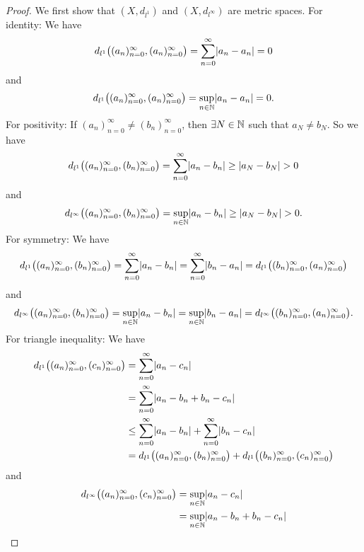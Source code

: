 \begin{proof}
  We first show that \((X, d_{l^1})\) and \((X, d_{l^\infty})\) are metric spaces.
  For identity:
  We have
  \[
    d_{l^1}\big((a_n)_{n = 0}^\infty, (a_n)_{n = 0}^\infty\big) = \sum_{n = 0}^\infty \abs{a_n - a_n} = 0
  \]
  and
  \[
    d_{l^1}\big((a_n)_{n = 0}^\infty, (a_n)_{n = 0}^\infty\big) = \sup_{n \in \N} \abs{a_n - a_n} = 0.
  \]
  For positivity:
  If \((a_n)_{n = 0}^\infty \neq (b_n)_{n = 0}^\infty\), then \(\exists N \in \mathbb{N}\) such that \(a_N \neq b_N\).
  So we have
  \[
    d_{l^1}\big((a_n)_{n = 0}^\infty, (b_n)_{n = 0}^\infty\big) = \sum_{n = 0}^\infty \abs{a_n - b_n} \geq \abs{a_N - b_N} > 0
  \]
  and
  \[
    d_{l^\infty}\big((a_n)_{n = 0}^\infty, (b_n)_{n = 0}^\infty\big) = \sup_{n \in \N} \abs{a_n - b_n} \geq \abs{a_N - b_N} > 0.
  \]
  For symmetry:
  We have
  \[
    d_{l^1}\big((a_n)_{n = 0}^\infty, (b_n)_{n = 0}^\infty\big) = \sum_{n = 0}^\infty \abs{a_n - b_n} = \sum_{n = 0}^\infty \abs{b_n - a_n} = d_{l^1}\big((b_n)_{n = 0}^\infty, (a_n)_{n = 0}^\infty\big)
  \]
  and
  \[
    d_{l^\infty}\big((a_n)_{n = 0}^\infty, (b_n)_{n = 0}^\infty\big) = \sup_{n \in \N} \abs{a_n - b_n} = \sup_{n \in \N} \abs{b_n - a_n} = d_{l^\infty}\big((b_n)_{n = 0}^\infty, (a_n)_{n = 0}^\infty\big).
  \]
  For triangle inequality:
  We have
  \begin{align*}
    d_{l^1}\big((a_n)_{n = 0}^\infty, (c_n)_{n = 0}^\infty\big) & = \sum_{n = 0}^\infty \abs{a_n - c_n}                                                                                       \\
                                                                & = \sum_{n = 0}^\infty \abs{a_n - b_n + b_n - c_n}                                                                           \\
                                                                & \leq \sum_{n = 0}^\infty \abs{a_n - b_n} + \sum_{n = 0}^\infty \abs{b_n - c_n}                                              \\
                                                                & = d_{l^1}\big((a_n)_{n = 0}^\infty, (b_n)_{n = 0}^\infty\big) + d_{l^1}\big((b_n)_{n = 0}^\infty, (c_n)_{n = 0}^\infty\big)
  \end{align*}
  and
  \begin{align*}
    d_{l^\infty}\big((a_n)_{n = 0}^\infty, (c_n)_{n = 0}^\infty\big) & = \sup_{n \in \N} \abs{a_n - c_n}                                                                                                      \\
                                                                     & = \sup_{n \in \N} \abs{a_n - b_n + b_n - c_n}                                                                                          \\

\end{align*}
\end{proof}
